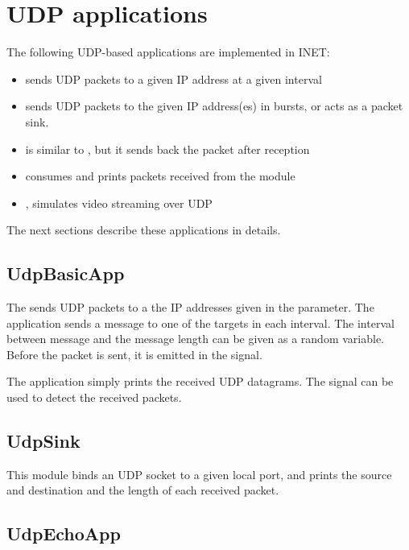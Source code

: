 \section{UDP applications}

The following UDP-based applications are implemented in INET:

\begin{itemize}
\item {} sends UDP packets to a given IP address at a given interval
\item {} sends UDP packets to the given IP address(es) in bursts, or acts as a packet sink.
\item {} is similar to , but it sends back the packet after reception
\item {} consumes and prints packets received from the  module
\item {}, simulates video streaming over UDP
\end{itemize}

The next sections describe these applications in details.

\subsection{UdpBasicApp}

The  sends UDP packets to a the IP addresses given in the
 parameter. The application sends a message to one of the
targets in each  interval. The interval between message and
the message length can be given as a random variable. Before the packet is
sent, it is emitted in the  signal.

The application simply prints the received UDP datagrams. The 
signal can be used to detect the received packets.

\subsection{UdpSink}

This module binds an UDP socket to a given local port, and prints the
source and destination and the length of each received packet.


\subsection{UdpEchoApp}


